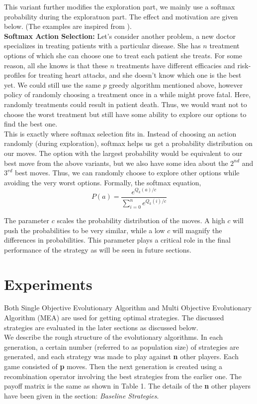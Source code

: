 \documentclass[a4paper]{article}
\begin{document}
	This variant further modifies the exploration part, we mainly use a softmax probability during the exploratuon part. The effect and motivation are given below. (The examples are inspired from \cite{reinf}).\\
	
	\textbf{Softmax Action Selection:} Let's consider another problem, a new doctor specializes in treating patients with a particular disease. She has $n$ treatment options of which she can choose one to treat each patient she treats. For some reason, all she knows is that these $n$ treatments have different efficacies and risk-profiles for treating heart attacks, and she doesn't know which one is the best yet. We could still use the same $p$ greedy algorithm mentioned above, however policy of randomly choosing a treatment once in a while might prove fatal. Here, randomly treatments could result in patient death. Thus, we would want not to choose the worst treatment but still have some ability to explore our options to find the best one.\\
	
	This is exactly where softmax selection fits in. Instead of choosing an action randomly (during exploration), softmax helps us get a probability distribution on our moves. The option with the largest probability would be equivalent to our best move from the above variants, but we also have some idea about the $2^{nd}$ and $3^{rd}$ best moves. Thus, we can randomly choose to explore other options while avoiding the very worst options. Formally, the softmax equation,
\begin{equation}
	P(a) = \frac{e^{Q_{k}(a)/c}}{\sum_{i=0}^{n} {e^{Q_{k}(i)/c}}}
\end{equation} 
	
	The parameter $c$ scales the probability distribution of the moves. A high $c$ will push the probabilities to be very similar, while a low $c$ will magnify the differences in probabilities. This parameter plays a critical role in the final performance of the strategy as will be seen in future sections.
	
	\pagebreak	
	
	\section{Experiments}
	
	Both Single Objective Evolutionary Algorithm and Multi Objective Evolutionary Algorithm (MEA) are used for getting optimal strategies. The discussed strategies are evaluated in the later sections as discussed below.\\
	We describe the rough structure of the evolutionary algorithms. In each generation, a certain number (referred to as population size) of strategies are generated, and each strategy was made to play against \textbf{n} other players. Each game consisted of \textbf{p} moves. Then the next generation is created using a recombination operator involving the best strategies from the earlier one. The payoff matrix is the same as shown in Table 1. The details of the \textbf{n} other players have been given in the section: \textit{Baseline Strategies}.
\end{document}
